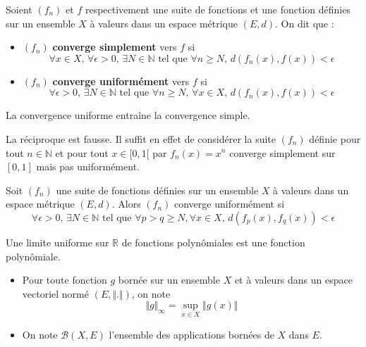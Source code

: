 	\begin{definition}
		Soient $(f_n)$ et $f$ respectivement une suite de fonctions et une fonction définies sur un ensemble $X$ à valeurs dans un espace métrique $(E, d)$. On dit que :
		\begin{itemize}
			\item $(f_n)$ \textbf{converge simplement} vers $f$ si
			\[ \forall x \in X, \, \forall \epsilon > 0, \, \exists N \in \mathbb{N} \text{ tel que } \forall n \geq N, \, d(f_n(x), f(x)) < \epsilon \]
			\item $(f_n)$ \textbf{converge uniformément} vers $f$ si
			\[ \forall \epsilon > 0, \, \exists N \in \mathbb{N} \text{ tel que } \forall n \geq N, \, \forall x \in X, \, d(f_n(x), f(x)) < \epsilon \]
		\end{itemize}
	\end{definition}

	\begin{proposition}
		La convergence uniforme entraîne la convergence simple.
	\end{proposition}

	\begin{cexample}
		La réciproque est fausse. Il suffit en effet de considérer la suite $(f_n)$ définie pour tout $n \in \mathbb{N}$ et pour tout $x \in [0,1[$ par $f_n(x) = x^n$ converge simplement sur $[0,1]$ mais pas uniformément.
	\end{cexample}

	\begin{theorem}
		Soit $(f_n)$ une suite de fonctions définies sur un ensemble $X$ à valeurs dans un espace métrique $(E, d)$. Alors $(f_n)$ converge uniformément si
		\[ \forall \epsilon > 0, \, \exists N \in \mathbb{N} \text{ tel que } \forall p > q \geq N, \forall x \in X, \, d(f_p(x), f_q(x)) < \epsilon \]
	\end{theorem}


	\begin{corollary}
		Une limite uniforme sur $\mathbb{R}$ de fonctions polynômiales est une fonction polynômiale.
	\end{corollary}


	\begin{notation}
		\begin{itemize}
			\item Pour toute fonction $g$ bornée sur un ensemble $X$ et à valeurs dans un espace vectoriel normé $(E, \Vert . \Vert)$, on note
			\[ \Vert g \Vert_\infty = \sup_{x \in X} \Vert g(x) \Vert \]
			\item On note $\mathcal{B}(X,E)$ l'ensemble des applications bornées de $X$ dans $E$.
		\end{itemize}
	\end{notation}

